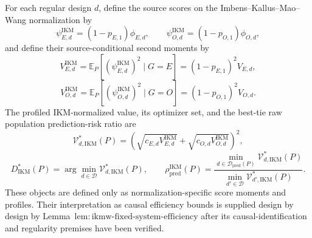 For each regular design \(d\), define the source scores on the Imbens--Kallus--Mao--Wang normalization by
\[
 \psi_{E,d}^{\mathrm{IKM}}=(1-p_{E,1})\phi_{E,d},
 \qquad
 \psi_{O,d}^{\mathrm{IKM}}=(1-p_{O,1})\phi_{O,d},
\]
and define their source-conditional second moments by
\[
 V_{E,d}^{\mathrm{IKM}}
 =\mathbb E_P[(\psi_{E,d}^{\mathrm{IKM}})^2\mid G=E]
 =(1-p_{E,1})^2V_{E,d},
\]
\[
 V_{O,d}^{\mathrm{IKM}}
 =\mathbb E_P[(\psi_{O,d}^{\mathrm{IKM}})^2\mid G=O]
 =(1-p_{O,1})^2V_{O,d}.
\]
The profiled IKM-normalized value, its optimizer set, and the best-tie raw population prediction-risk ratio are
\[
 \mathcal V_{d,\mathrm{IKM}}^*(P)
 =\left(
 \sqrt{c_{E,d}V_{E,d}^{\mathrm{IKM}}}
 +\sqrt{c_{O,d}V_{O,d}^{\mathrm{IKM}}}
 \right)^2,
\]
\[
 D_{\mathrm{IKM}}^*(P)
 =\arg\min_{d\in\mathcal D}\mathcal V_{d,\mathrm{IKM}}^*(P),
 \qquad
 \rho_{\mathrm{pred}}^{\mathrm{IKM}}(P)
 =\frac{\min_{d\in\mathcal D_{\mathrm{pred}}(P)}
 \mathcal V_{d,\mathrm{IKM}}^*(P)}
 {\min_{d'\in\mathcal D}\mathcal V_{d',\mathrm{IKM}}^*(P)}.
\]
These objects are defined only as normalization-specific score moments and profiles. Their interpretation as causal efficiency bounds is supplied design by design by Lemma~\(\mathrm{lem{:}ikmw\text{-}fixed\text{-}system\text{-}efficiency}\) after its causal-identification and regularity premises have been verified.
